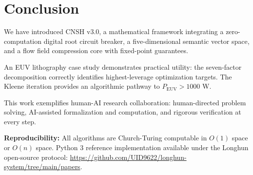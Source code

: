 \documentclass[twocolumn]{article}
\begin{document}
\section{Conclusion}

We have introduced CNSH v3.0, a mathematical framework integrating a zero-computation digital root circuit breaker, a five-dimensional semantic vector space, and a flow field compression core with fixed-point guarantees.

An EUV lithography case study demonstrates practical utility: the seven-factor decomposition correctly identifies highest-leverage optimization targets. The Kleene iteration provides an algorithmic pathway to $P_{\text{EUV}} > 1000$ W.

This work exemplifies human-AI research collaboration: human-directed problem solving, AI-assisted formalization and computation, and rigorous verification at every step.

\textbf{Reproducibility:} All algorithms are Church-Turing computable in $O(1)$ space or $O(n)$ space. Python 3 reference implementation available under the Longhun open-source protocol: \url{https://github.com/UID9622/longhun-system/tree/main/papers}.
\end{document}
